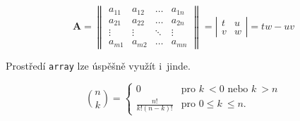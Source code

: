 \documentclass[twocolumn, 11pt]{article}
\theoremstyle{definition}
\begin{document}
\[ \mathbf{A}=\left\|\begin{array}{cccc}
a_{11} & a_{12} & \ldots & a_{1n} \\
a_{21} & a_{22} & \ldots & a_{2n} \\
\vdots & \vdots & \ddots & \vdots \\
a_{m1} & a_{m2} & \ldots & a_{mn}
\end{array}\right\| = \left|\begin{array}{cc}
t & u \\
v & w
\end{array}\right| = tw - uv \]

Prostředí \verb|array| lze úspěšně využít i~jinde.

\[\binom{n}{k} = \left\{\begin{array}{cl}
0 & \text{pro } k\ < 0 \text{ nebo } k\ > n \\
\frac{n!}{k! (n - k)!} & \text{pro } 0 \leq k\ \leq n.
\end{array}\right. \]
\end{document}
